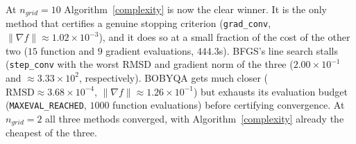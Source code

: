 \documentclass[11pt]{article}
\begin{document}
\begin{table}[htbp]
\centering
\caption{Pregenerated-data experiment, $n_{grid}=10$: decreasing profile $\xi^\star$
    from $0.20$ to $0.15$, $\xi^0=(0.25,\ldots,0.25)$.}
\label{tab:pregenerated-dim10}
%
\end{table}
\FloatBarrier

\noindent
At $n_{grid}=10$ Algorithm~\ref{complexity} is now the clear winner. It is
the only method that certifies a genuine stopping criterion
(\texttt{grad\_conv}, $\|\nabla f\|\approx1.02\times10^{-3}$), and it does
so at a small fraction of the cost of the other two ($15$ function and $9$
gradient evaluations, $444.3$s). BFGS's line search stalls
(\texttt{step\_conv} with the worst RMSD and gradient norm of the three
($2.00\times10^{-1}$ and $\approx3.33\times10^2$, respectively).
BOBYQA gets much closer ($\text{RMSD}\approx3.68\times10^{-4}$, $\|\nabla
f\|\approx1.26\times10^{-1}$) but exhausts its evaluation budget
(\texttt{MAXEVAL\_REACHED}, $1000$ function evaluations) before
certifying convergence. At $n_{grid}=2$ all three methods converged, with
Algorithm~\ref{complexity} already the cheapest of the three. 

\begin{table}[htbp]
\centering
\caption{Real data, $n_{grid}=2$: $\xi^0=(0.25,0.25)$.}
\label{tab:real-dim2}
%
\end{table}
\FloatBarrier
\end{document}
